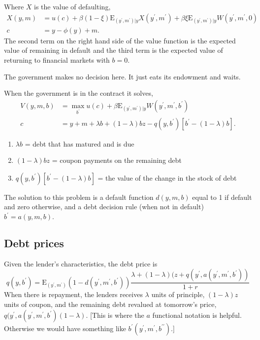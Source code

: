 \documentclass[11pt, pdftex]{article}
\newcommand{\E}{\mathrm{E}}
\begin{document}
Where $X$ is the value of defaulting,
\begin{align}
  X(y,m)&=u(c)+\beta(1-\xi)\E_{(y^\prime,m^\prime)|y}X(y^\prime,m^\prime)+\beta\xi\E_{(y^\prime,m^\prime)|y}W(y^\prime,m^\prime,0)\\
  c&=y-\phi(y)+m.
\end{align}
The second term on the right hand side of the value function is the expected value of remaining in default and the third term is the expected value of returning to financial markets with $b=0$.

The government makes no decision here. It just eats its endowment and waits.

When the government is in the contract it solves,
\begin{align}
  V(y,m,b)&=\max_{b^\prime}u(c)+\beta\E_{(y^\prime,m^\prime)|y}W(y^\prime,m^\prime,b^\prime)\\
  c&=y+m+\lambda b +(1-\lambda)bz-q(y,b^\prime)[b^\prime-(1-\lambda)b].
\end{align}
\begin{enumerate}
  \item $\lambda b$ = debt that has matured and is due
  \item $(1-\lambda)bz$ = coupon payments on the remaining debt
  \item $q(y,b^\prime)[b^\prime-(1-\lambda)b]$ = the value of the change in the stock of debt
\end{enumerate}
The solution to this problem is a default function $d(y,m,b)$ equal to 1 if default and zero otherwise, and a debt decision rule (when not in default) $b^\prime=a(y,m,b)$.

\subsection*{Debt prices}
Given the lender's characteristics, the debt price is
\begin{equation}\label{eq:ce-price-debt}
  q(y,b^\prime) = \E_{(y^\prime,m^\prime)}\left(1-d\left(y^\prime,m^\prime, b^\prime\right)\right)\frac{\lambda+(1-\lambda)(z+q(y^\prime,a(y^\prime,m^\prime,b^\prime))}{1+r}
\end{equation}
When there is repayment, the lenders receives $\lambda$ units of principle, $(1-\lambda)z$ units of coupon, and the remaining debt revalued at tomorrow's price, $q(y^\prime,a(y^\prime,m^\prime,b^\prime)(1-\lambda)$. [This is where the $a$ functional notation is helpful. Otherwise we would have something like $b^\prime(y^\prime, m^\prime, b^{\prime\prime})$.]
\end{document}
